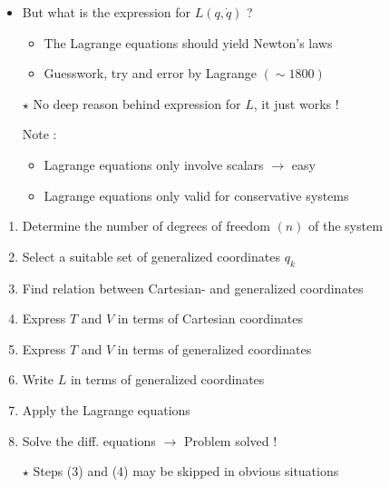 \Tr
\begin{itemize}
\item But what is the expression for $L(q,\dot{q})$ ?
\begin{itemize}
\item The Lagrange equations should yield Newton's laws
\item Guesswork, try and error by Lagrange $(\sim 1800)$
\end{itemize}
\end{itemize}
%
\begin{center}
{\red {}}
\end{center}
%
\begin{itemize}
\item[$\star$] No deep reason behind expression for $L$, it just works !
\item[] Note :
\begin{itemize}
\item Lagrange equations only involve scalars $\rightarrow$ easy
\item Lagrange equations only valid for conservative systems
\end{itemize}
\end{itemize}

\Tr
\begin{center}
{\red {}}
\end{center}
%
\begin{enumerate}
\item Determine the number of degrees of freedom $(n)$ of the system
\item Select a suitable set of generalized coordinates $q_{k}$
\item Find relation between Cartesian- and generalized coordinates
\item Express $T$ and $V$ in terms of Cartesian coordinates
\item Express $T$ and $V$ in terms of generalized coordinates
\item Write $L$ in terms of generalized coordinates
\item Apply the Lagrange equations
\item Solve the diff. equations $\rightarrow$ Problem solved !
\end{enumerate}
%
\begin{itemize}
\item[$\star$] Steps (3) and (4) may be skipped in obvious situations
\end{itemize}

